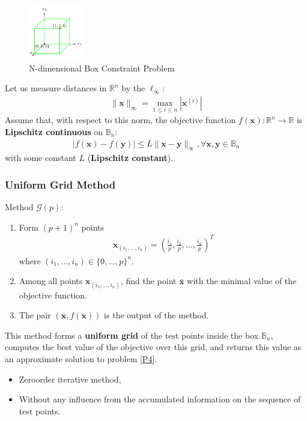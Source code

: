 \begin{figure}[!htb]
    \centering
    \includegraphics[width=0.22\textwidth]{pic/Opt1/N-d Box.png}
    \caption{N-dimensional Box Constraint Problem}
\end{figure}

Let us measure distances in $\mathbb{R}^n$ by the ${\ell}_\infty$:
\begin{align*}
    \|\bm x\|_\infty=\max_{1\le i\le n}|\bm x^{(i)}|
\end{align*}
Assume that, with respect to this norm, the objective function $f(\bm x):\mathbb{R}^n\to \mathbb{R}$ is \textbf{Lipschitz continuous} on $\mathbb{B}_n$:
\begin{align}
    |f(\bm x)-f(\bm y)|\le L\| \bm x-\bm y \|_\infty, \forall \bm x, \bm y\in \mathbb{B}_n \label{P5}
\end{align}
with some constant $L$ (\textbf{Lipschitz constant}).

\subsubsection{Uniform Grid Method}
Method $\mathcal{G}(p)$:
\begin{enumerate}
    \item Form $(p+1)^n$ points
    \begin{align*}
        \bm x_{(i_1,\dots,i_n)}=\left( \frac{i_1}{p}, \frac{i_2}{p},\dots,\frac{i_n}{p} \right)^T
    \end{align*}
    where $(i_1,\dots,i_n) \in \{ 0, \dots,p\}^n$.
    \item Among all points $\bm x_{(i_1,\dots,i_n)}$, find the point $\bar{\bm x}$ with the minimal value of the objective function.
    \item The pair $(\bar{\bm x}, f(\bar{\bm x}))$ is the output of the method.
\end{enumerate}
This method forms a \textbf{uniform grid} of the test points inside the box $\mathbb{B}_n$, computes the best value of the objective over this grid, and returns this value as an approximate solution to problem \ref{P4}. 
\begin{itemize}
    \item Zeroorder iterative method,
    \item Without any influence from the accumulated information on the sequence of test points.
\end{itemize}


